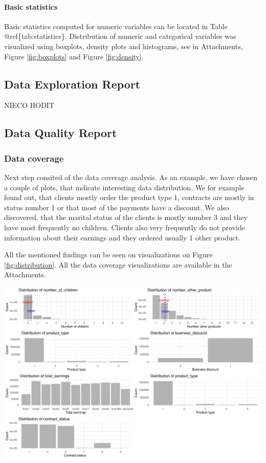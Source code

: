 \documentclass[
]{article}
\begin{document}
\hypertarget{basic-statistics}{%
\paragraph{Basic statistics}\label{basic-statistics}}

Basic statistics computed for numeric variables can be located in Table @ref\{tab:statistics\}. Distribution of numeric and categorical variables was visualized using boxplots, density plots and histograms, see in Attachments, Figure \ref{fig:boxplots} and Figure \ref{fig:density}.

\hypertarget{data-exploration-report}{%
\subsection{Data Exploration Report}\label{data-exploration-report}}

NIECO HODIT

\hypertarget{data-quality-report}{%
\subsection{Data Quality Report}\label{data-quality-report}}

\hypertarget{data-coverage}{%
\subsubsection{Data coverage}\label{data-coverage}}

Next step consited of the data coverage analysis. As an example, we have chosen a couple of plots, that indicate interesting data distribution.
We for example found out, that clients mostly order the product type 1, contracts are mostly in status number 1 or that most of the payments have a discount.
We also discovered, that the marital status of the clients is mostly number 3 and they have most frequently no children. Clients also very frequently do not provide information about their earnings and they ordered usually 1 other product.

All the mentioned findings can be seen on visualizations on Figure \ref{fig:distribution}. All the data coverage visualizations are available in the Attachments.

\includegraphics{Documentation_Rmarkdown_files/figure-latex/distribution-1.pdf}
\end{document}
